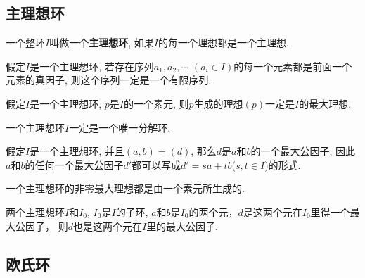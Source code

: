 
\subsection{主理想环} %

\begin{Definition}[主理想环]
一个整环$I$叫做一个\textbf{主理想环}, 如果$I$的每一个理想都是一个主理想.
\end{Definition}

\begin{Lemma}
假定$I$是一个主理想环, 若存在序列$a_1, a_2, \cdots$ $(a_i \in I)$的每一个元素都是前面一个元素的真因子, 则这个序列一定是一个有限序列.
\end{Lemma}

\begin{Lemma}[!!]
假定$I$是一个主理想环, $p$是$I$的一个素元, 则$p$生成的理想$(p)$一定是$I$的最大理想.
\end{Lemma}

\begin{Theorem}
一个主理想环$I$一定是一个唯一分解环.
\end{Theorem}

\begin{Proposition}
假定$I$是一个主理想环, 并且$(a, b) = (d)$, 那么$d$是$a$和$b$的一个最大公因子, 因此$a$和$b$的任何一个最大公因子$d'$都可以写成$d' = sa +tb$\;($s, t \in I$)的形式.
\end{Proposition}

\begin{Proposition}
一个主理想环的非零最大理想都是由一个素元所生成的.
\end{Proposition}

\begin{Proposition}
两个主理想环$I$和$I_0$, $I_0$是$I$的子环, $a$和$b$是$I_0$的两个元，$d$是这两个元在$I_0$里得一个最大公因子， 则$d$也是这两个元在$I$里的最大公因子.
\end{Proposition}

\subsection{欧氏环} %

